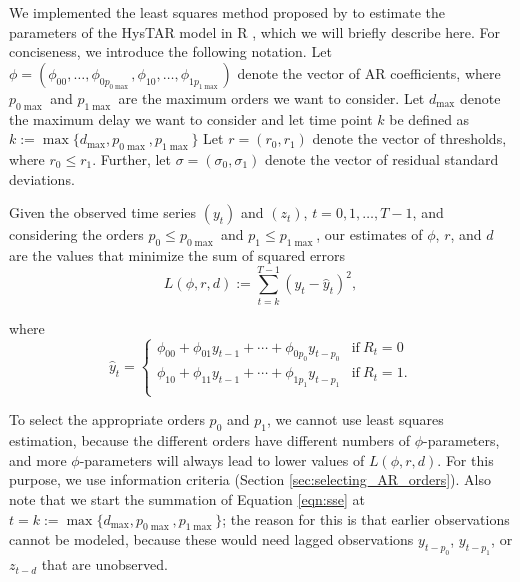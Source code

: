 \documentclass{article}
\begin{document}
We implemented the least squares method proposed by \citet{bar2} to estimate the parameters of the HysTAR model in \textsf{R} \citep{R, R_hystar}, which we will briefly describe here.
For conciseness, we introduce the following notation.
Let $\phi = (\phi_{00}, \dots, \phi_{0 p_{0\max}}, \phi_{10}, \dots, \phi_{1 p_{1\max}})$ denote the  vector of AR coefficients, where $p_{0\max}$ and $p_{1\max}$ are the maximum orders we want to consider.
Let $d_{\max}$ denote the maximum delay we want to consider and let time point $k$ be defined as $k :=\max\{d_{\max}, p_{0\max}, p_{1\max}\}$
Let $r = (r_0, r_1)$ denote the vector of thresholds, where $r_0 \le r_1$.
Further, let $\sigma = (\sigma_{0}, \sigma_{1})$ denote the  vector of residual standard deviations.

Given the observed time series $(y_t)$ and $(z_t)$, $t = 0, 1, \dots, T-1$, and considering the orders $p_0 \le p_{0\max}$ and $p_1 \le p_{1\max}$, our estimates of $\phi$, $r$, and $d$ are the values that minimize the sum of squared errors
\begin{equation} \label{eqn:sse}
L(\phi, r, d) := \sum_{t = k}^{T-1} (y_t - \hat{y}_t)^2,
\end{equation}

\noindent where
\begin{equation}
\hat{y}_t = 
\begin{cases}
\phi_{00} + \phi_{01} y_{t-1} + \cdots + \phi_{0 p_0} y_{t-p_0} 
& \text{if}~R_{t} = 0\\
\phi_{10} + \phi_{11} y_{t-1} + \cdots + \phi_{1 p_1} y_{t-p_1} 
& \text{if}~R_{t} = 1. \\
\end{cases}
\end{equation}

To select the appropriate orders $p_0$ and $p_1$, we cannot use least squares estimation, because the different orders have different numbers of $\phi$-parameters, and more $\phi$-parameters will always lead to lower values of $L(\phi, r, d)$. For this purpose, we use information criteria (Section \ref{sec:selecting_AR_orders}).
Also note that we start the summation of Equation \ref{eqn:sse} at $t = k :=\max\{d_{\max}, p_{0\max}, p_{1\max}\}$; the reason for this is that earlier observations cannot be modeled, because these would need lagged observations $y_{t-p_0}$, $y_{t-p_1}$, or $z_{t-d}$ that are unobserved.
\end{document}
